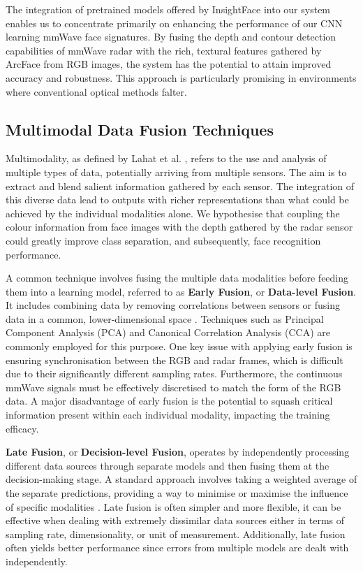 \documentclass{interim}
\begin{document}
The integration of pretrained models offered by InsightFace into our system enables us to concentrate primarily on enhancing the performance of our CNN learning mmWave face signatures. By fusing the depth and contour detection capabilities of mmWave radar with the rich, textural features gathered by ArcFace from RGB images, the system has the potential to attain improved accuracy and robustness. This approach is particularly promising in environments where conventional optical methods falter.


\subsection{Multimodal Data Fusion Techniques}
\label{background:multimodal_data_fusion_techniques}
Multimodality, as defined by Lahat et al. \cite{lahat2015multimodal}, refers to the use and analysis of multiple types of data, potentially arriving from multiple sensors. The aim is to extract and blend salient information gathered by each sensor. The integration of this diverse data lead to outputs with richer representations than what could be achieved by the individual modalities alone. We hypothesise that coupling the colour information from face images with the depth gathered by the radar sensor could greatly improve class separation, and subsequently, face recognition performance.

A common technique involves fusing the multiple data modalities before feeding them into a learning model, referred to as \textbf{Early Fusion}, or \textbf{Data-level Fusion}. It includes combining data by removing correlations between sensors or fusing data in a common, lower-dimensional space \cite{khaleghi2013multisensor}. Techniques such as Principal Component Analysis (PCA) and Canonical Correlation Analysis (CCA) are commonly employed for this purpose. One key issue with applying early fusion is ensuring synchronisation between the RGB and radar frames, which is difficult due to their significantly different sampling rates. Furthermore, the continuous mmWave signals must be effectively discretised to match the form of the RGB data. A major disadvantage of early fusion is the potential to squash critical information present within each individual modality, impacting the training efficacy.

\textbf{Late Fusion}, or \textbf{Decision-level Fusion}, operates by independently processing different data sources through separate models and then fusing them at the decision-making stage. A standard approach involves taking a weighted average of the separate predictions, providing a way to minimise or maximise the influence of specific modalities \cite{pawlowski2023effective}. Late fusion is often simpler and more flexible, it can be effective when dealing with extremely dissimilar data sources either in terms of sampling rate, dimensionality, or unit of measurement. Additionally, late fusion often yields better performance since errors from multiple models are dealt with independently.
\end{document}

